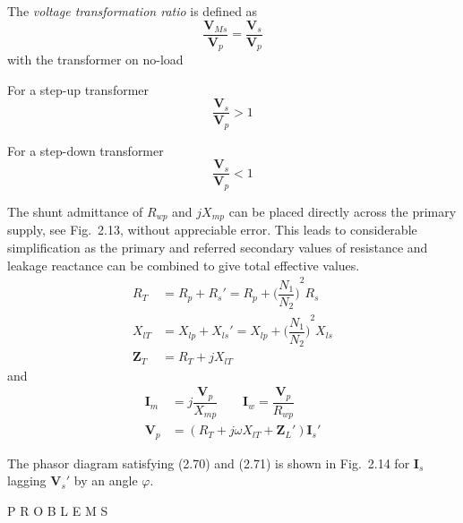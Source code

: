 \documentclass[a4paper,numbers=noenddot,12pt]{scrbook}
\begin{document}
The \textit{voltage transformation ratio} is defined as
\begin{equation}
    \dfrac{\mathbf{V}_{Ms}}{\mathbf{V}_p} = \dfrac{\mathbf{V}_s}{\mathbf{V}_p}
    \label{eq:Eq2.68}
\end{equation}
with the transformer on no-load

For a step-up transformer
\begin{equation*}
    \dfrac{\mathbf{V}_s}{\mathbf{V}_p} > 1
\end{equation*}

For a step-down transformer
\begin{equation*}
    \dfrac{\mathbf{V}_s}{\mathbf{V}_p} < 1
\end{equation*}

The shunt admittance of $R_{wp}$ and $jX_{mp}$ can be placed directly across the primary supply, see Fig.\ 2.13, without appreciable error. This leads to considerable simplification as the primary and referred secondary values of resistance and leakage reactance can be combined to give total effective values.
\begin{equation}
    \begin{aligned}
        R_T & = R_p + R_s' = R_p + {\Big( \dfrac{N_1}{N_2}\Big)}^2 R_s \\
        X_{lT} & = X_{lp} + X_{ls}' = X_{lp} + {\Big( \dfrac{N_1}{N_2}\Big)}^2 X_{ls} \\
        \mathbf{Z}_T & = R_T + jX_{lT}
    \end{aligned}
    \label{eq:Eq2.69}
\end{equation}
and
\begin{align}
    \mathbf{I}_m & = j \dfrac{\mathbf{V}_p}{X_{mp}} \qquad \mathbf{I}_w = \dfrac{\mathbf{V}_p}{R_{wp}} \\
    \mathbf{V}_p & = (R_T + j \omega X_{lT} + \mathbf{Z}_L')\mathbf{I}_s'
    \label{eq:Eq2.71}
\end{align}

The phasor diagram satisfying (2.70) and (2.71) is shown in Fig.\ 2.14 for $\mathbf{I}_s$ lagging $\mathbf{V}_s'$ by an angle $\varphi$.

\begingroup
\fontsize{10pt}{12pt}\selectfont
\begin{center}
    P R O B L E M S
\end{center}
\end{document}
